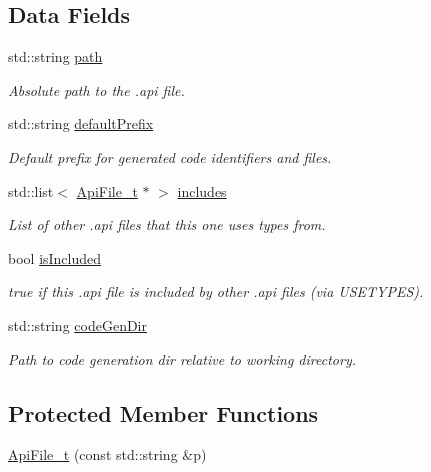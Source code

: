\subsection*{Data Fields}
\begin{DoxyCompactItemize}
\item 
std\+::string \hyperlink{struct_api_file__t_a1bae4c510119f193e9466cfe7e3c50d1}{path}
\begin{DoxyCompactList}\small\item\em Absolute path to the .api file. \end{DoxyCompactList}\item 
std\+::string \hyperlink{struct_api_file__t_a63d7e4e1d75ff7da2405b5e7bf440bc1}{default\+Prefix}
\begin{DoxyCompactList}\small\item\em Default prefix for generated code identifiers and files. \end{DoxyCompactList}\item 
std\+::list$<$ \hyperlink{struct_api_file__t}{Api\+File\+\_\+t} $\ast$ $>$ \hyperlink{struct_api_file__t_af7ec786baded7bc95d53ba85e99fd812}{includes}
\begin{DoxyCompactList}\small\item\em List of other .api files that this one uses types from. \end{DoxyCompactList}\item 
bool \hyperlink{struct_api_file__t_a629534cf30c0a78fc4fa28b61850e402}{is\+Included}
\begin{DoxyCompactList}\small\item\em true if this .api file is included by other .api files (via U\+S\+E\+T\+Y\+P\+ES). \end{DoxyCompactList}\item 
std\+::string \hyperlink{struct_api_file__t_acb177612bbf4948cf91949cecf14ba34}{code\+Gen\+Dir}
\begin{DoxyCompactList}\small\item\em Path to code generation dir relative to working directory. \end{DoxyCompactList}\end{DoxyCompactItemize}
\subsection*{Protected Member Functions}
\begin{DoxyCompactItemize}
\item 
\hyperlink{struct_api_file__t_a6854b55941333bc3ba3760f7899737f0}{Api\+File\+\_\+t} (const std\+::string \&p)
\end{DoxyCompactItemize}

